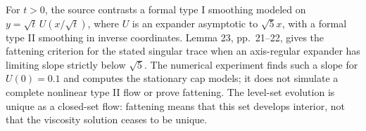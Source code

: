 \begin{example}
For $t>0$, the source contrasts a formal type I smoothing modeled on $y=\sqrt t\,U(x/\sqrt t)$, where $U$ is an expander asymptotic to $\sqrt5x$, with a formal type II smoothing in inverse coordinates. Lemma 23, pp.~21--22, gives the fattening criterion for the stated singular trace when an axis-regular expander has limiting slope strictly below $\sqrt5$. The numerical experiment finds such a slope for $U(0)=0.1$ and computes the stationary cap models; it does not simulate a complete nonlinear type II flow or prove fattening. The level-set evolution is unique as a closed-set flow: fattening means that this set develops interior, not that the viscosity solution ceases to be unique.
\end{example}
